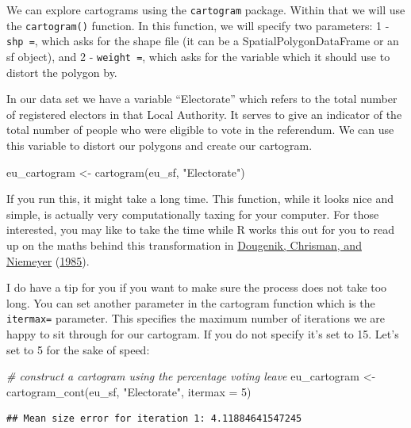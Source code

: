 \documentclass[
]{book}
\newenvironment{Shaded}{\begin{snugshade}}{\end{snugshade}}
\newcommand{\AttributeTok}[1]{\textcolor[rgb]{0.77,0.63,0.00}{#1}}
\newcommand{\CommentTok}[1]{\textcolor[rgb]{0.56,0.35,0.01}{\textit{#1}}}
\newcommand{\DecValTok}[1]{\textcolor[rgb]{0.00,0.00,0.81}{#1}}
\newcommand{\FunctionTok}[1]{\textcolor[rgb]{0.00,0.00,0.00}{#1}}
\newcommand{\NormalTok}[1]{#1}
\newcommand{\OtherTok}[1]{\textcolor[rgb]{0.56,0.35,0.01}{#1}}
\newcommand{\StringTok}[1]{\textcolor[rgb]{0.31,0.60,0.02}{#1}}
\begin{document}
We can explore cartograms using the \texttt{cartogram} package. Within that we will use the \texttt{cartogram()} function. In this function, we will specify two parameters: 1 - \texttt{shp\ =}, which asks for the shape file (it can be a SpatialPolygonDataFrame or an sf object), and 2 - \texttt{weight\ =}, which asks for the variable which it should use to distort the polygon by.

In our data set we have a variable ``Electorate'' which refers to the total number of registered electors in that Local Authority. It serves to give an indicator of the total number of people who were eligible to vote in the referendum. We can use this variable to distort our polygons and create our cartogram.

\begin{Shaded}
\begin{Highlighting}[]
\NormalTok{eu\_cartogram }\OtherTok{\textless{}{-}} \FunctionTok{cartogram}\NormalTok{(eu\_sf, }\StringTok{"Electorate"}\NormalTok{)}
\end{Highlighting}
\end{Shaded}

If you run this, it might take a long time. This function, while it looks nice and simple, is actually very computationally taxing for your computer. For those interested, you may like to take the time while R works this out for you to read up on the maths behind this transformation in \protect\hyperlink{ref-Dougenik_1985}{Dougenik, Chrisman, and Niemeyer} (\protect\hyperlink{ref-Dougenik_1985}{1985}).

I do have a tip for you if you want to make sure the process does not take too long. You can set another parameter in the cartogram function which is the \texttt{itermax=} parameter. This specifies the maximum number of iterations we are happy to sit through for our cartogram. If you do not specify it's set to 15. Let's set to 5 for the sake of speed:

\begin{Shaded}
\begin{Highlighting}[]
\CommentTok{\# construct a cartogram using the percentage voting leave}
\NormalTok{eu\_cartogram }\OtherTok{\textless{}{-}} \FunctionTok{cartogram\_cont}\NormalTok{(eu\_sf, }\StringTok{"Electorate"}\NormalTok{, }\AttributeTok{itermax =} \DecValTok{5}\NormalTok{)}
\end{Highlighting}
\end{Shaded}

\begin{verbatim}
## Mean size error for iteration 1: 4.11884641547245
\end{verbatim}
\end{document}
